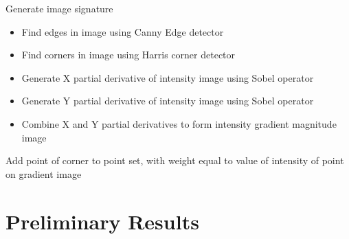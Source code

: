\documentclass[10pt,a4paper]{article}
\begin{document}
\begin{algorithm}
\caption{Generate image signature}
\begin{algorithmic} 
\begin{itemize}
\item Find edges in image using Canny Edge detector
\item Find corners in image using Harris corner detector
\item Generate X partial derivative of intensity image using Sobel operator
\item Generate Y partial derivative of intensity image using Sobel operator
\item Combine X and Y partial derivatives to form intensity gradient magnitude image
\end{itemize}
  Add point of corner to point set, with weight equal to value of intensity of point on gradient image \EndIf  \EndFor

\end{algorithmic}
\end{algorithm}

\section{Preliminary Results}
\end{document}
